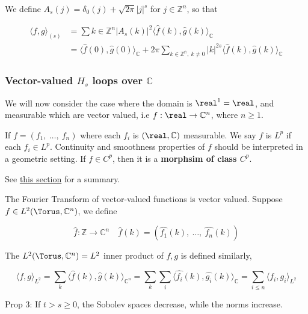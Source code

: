We define \(A_s(j) = \delta_0(j) + \sqrt{2\pi}\vert j\vert^s\) for
\(j\in\mathbb{Z}^n\), so that

\[
\begin{align}
\langle f,g\rangle_{(s)} &= \sum{k\in\mathbb{Z}^n} \vert A_s(k)\vert^2 \langle \hat{f}(k),\hat{g}(k)\rangle_{\mathbb{C}}\\
&= \langle \hat{f}(0),\hat{g}(0)\rangle_{\mathbb{C}} + 2\pi\sum_{k\in\mathbb{Z^n},\: k\neq 0}\vert k\vert^{2s}\langle \hat{f}(k),\hat{g}(k)\rangle_{\mathbb{C}}
\end{align}
\]

\hypertarget{vector-valued-h_s-loops-over-mathbbc}{%
\subsubsection{\texorpdfstring{Vector-valued \(H_s\) loops over
\(\mathbb{C}\)}{Vector-valued H\_s loops over \textbackslash mathbb\{C\}}}\label{vector-valued-h_s-loops-over-mathbbc}}

We will now consider the case where the domain is \(\real^1 = \real\),
and measurable which are vector valued, i.e
\(f: \real\to \mathbb{C}^n\), where \(n\geq 1\).

If \(f = (f_1,\: \ldots, \: f_n)\) where each \(f_i\) is
\((\real,\mathbb{C})\) measurable. We say \(f\) is \(L^p\) if each
\(f_i\in L^p\). Continuity and smoothness properties of \(f\) should be
interpreted in a geometric setting. If \(f\in C^p\), then it is a
\textbf{morphsim of class \(C^p\)}.

See
\href{\%7B\%7B\%20site.baseurl\%20\%7D\%7D/\%20\%7B\%\%20post_url\%202023-08-12-folland-distribution-excerpts\%20\%\%7D\#vector-valued-lp-spaces}{this
section} for a summary.

The Fourier Transform of vector-valued functions is vector valued.
Suppose \(f\in L^2(\Torus, \mathbb{C}^n)\), we define

\[
\hat{f}:\mathbb{Z}\to\mathbb{C}^n\quad \hat{f}(k) = (\hat{f_1}(k),\:\ldots,\:\hat{f_n}(k))
\]

The \(L^2(\Torus,\mathbb{C}^n)=L^2\) inner product of \(f,g\) is defined
similarly,

\[
\langle f,g\rangle_{L^2} = \sum_k \langle \hat{f}(k),\hat{g}(k)\rangle_{\mathbb{C}^n} =\sum_k\sum_i\langle\hat{f_i}(k),\hat{g_i} (k)\rangle_{\mathbb{C}} =\sum_{i\leq n}\langle f_i,g_i\rangle_{L^2}
\]

Prop 3: If \(t>s\geq 0\), the Sobolev spaces decrease, while the norms
increase.

